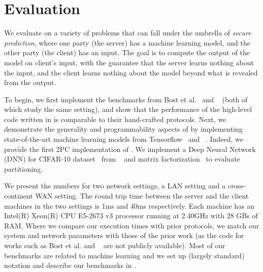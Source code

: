 \section{Evaluation}
\label{sec:eval}
We evaluate \tool on a variety of problems that can fall under the umbrella of {\it secure prediction}, where one
party (the server) has a machine learning model, and the other party
(the client) has an input. The goal is to compute the output of the
model on client's input, with the guarantee that the server
learns nothing about the input, and the client learns nothing
about the model beyond what is revealed from the output.

To begin, we first implement the benchmarks from Bost et al.~\cite{shafindss}
and \minion~\cite{minionn} (both of which study the same setting),
and show that the performance of the high-level code written in \tool
is comparable to their hand-crafted protocols.
%
Next, we demonstrate the generality and programmability aspects of
\tool by implementing state-of-the-art machine learning models from
Tensorflow~\cite{tensorflow} and \bonsai~\cite{bonsai}. Indeed, we
provide the first 2PC implementation of \bonsai.
%
We
implement a Deep Neural Network (DNN) for CIFAR-10
dataset~\cite{cifar} from \minion~\cite{minionn} and matrix factorization~\cite{valeriaMatrix}
to evaluate partitioning.

We present the numbers for two network settings, a LAN setting and
a cross-continent WAN setting. The round trip time between the server
and the client machines in the two settings is 1ms and 40ms respectively. Each
machine has an Intel(R) Xeon(R) CPU E5-2673 v3 processor running at
2.40GHz with 28 GBs of RAM. Where we compare our execution times with prior protocols, we match our system and network parameters with those of the prior work (as the code for works such as Bost et al. \cite{shafindss} and \minion~\cite{minionn} are not publicly available).
%
Most of our benchmarks
are related to machine learning and we set up (largely standard) notation and describe our benchmarks in .


